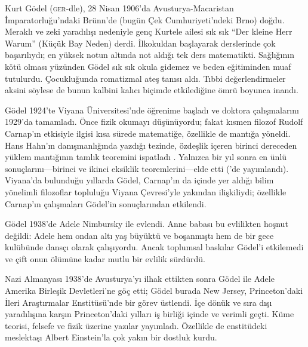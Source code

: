 




Kurt G{\"o}del (\textsc{ger}-dle), 28 Nisan 1906'da Avusturya-Macaristan
İmparatorluğu'ndaki Br{\"u}nn'de (bugün Çek Cumhuriyeti'ndeki Brno) doğdu.
Meraklı ve zeki yaradılışı nedeniyle genç Kurtele ailesi sık sık ``Der
kleine Herr Warum'' (Küçük Bay Neden) derdi. İlkokuldan başlayarak derslerinde
çok başarılıydı; en yüksek notun altında not aldığı tek ders matematikti.
Sağlığının kötü olması yüzünden G{\"o}del sık sık okula gidemez ve beden
eğitiminden muaf tutulurdu. Çocukluğunda romatizmal ateş tanısı aldı. Tıbbi
değerlendirmeler aksini söylese de bunun kalbini kalıcı biçimde etkilediğine
ömrü boyunca inandı.

G{\"o}del 1924'te Viyana Üniversitesi'nde öğrenime başladı ve doktora
çalışmalarını 1929'da tamamladı. Önce fizik okumayı düşünüyordu; fakat kısmen
filozof Rudolf Carnap'ın etkisiyle ilgisi kısa sürede matematiğe, özellikle de
mantığa yöneldi. Hans Hahn'ın danışmanlığında yazdığı tezinde, özdeşlik içeren
birinci dereceden yüklem mantığının tamlık teoremini ispatladı
\citep{Godel1929}. Yalnızca bir yıl sonra en ünlü sonuçlarını---birinci ve
ikinci eksiklik teoremlerini---elde etti (\citealt{Godel1931}'de yayımlandı).
Viyana'da bulunduğu yıllarda G{\"o}del, Carnap'ın da içinde yer aldığı bilim
yönelimli filozoflar topluluğu Viyana Çevresi'yle yakından ilişkiliydi;
özellikle Carnap'ın çalışmaları G{\"o}del'in sonuçlarından etkilendi.

G\"odel 1938'de Adele Nimbursky ile evlendi. Anne babası bu evlilikten hoşnut
değildi: Adele hem ondan altı yaş büyüktü ve boşanmıştı hem de bir gece
kulübünde dansçı olarak çalışıyordu. Ancak toplumsal baskılar G{\"o}del'i
etkilemedi ve çift onun ölümüne kadar mutlu bir evlilik sürdürdü.

Nazi Almanyası 1938'de Avusturya'yı ilhak ettikten sonra G{\"o}del ile Adele
Amerika Birleşik Devletleri'ne göç etti; G{\"o}del burada New Jersey,
Princeton'daki İleri Araştırmalar Enstitüsü'nde bir görev üstlendi. İçe dönük
ve sıra dışı yaradılışına karşın Princeton'daki yılları iş birliği içinde ve
verimli geçti. Küme teorisi, felsefe ve fizik üzerine yazılar yayımladı.
Özellikle de enstitüdeki meslektaşı Albert Einstein'la çok yakın bir dostluk
kurdu.

